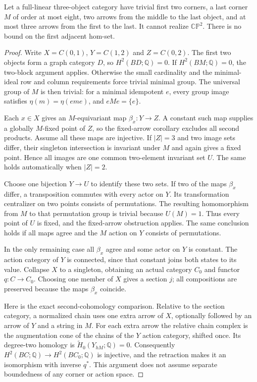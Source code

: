 \begin{proposition}
\label{CP2:A-baseline-two-small-incoming}
Let a full-linear three-object category have trivial
first two corners, a last corner $M$ of order at most
eight, two arrows from the middle to the last object,
and at most three arrows from the first to the last.
It cannot realize $\mathbb{CP}^2$.  There is no bound
on the first adjacent hom-set.
\end{proposition}
\begin{proof}
Write $X=C(0,1)$, $Y=C(1,2)$ and $Z=C(0,2)$.
The first two objects form a graph category $D$, so
$H^2(BD;\mathbb Q)=0$.  If $H^2(BM;\mathbb Q)=0$,
the two-block argument applies.  Otherwise the small
cardinality and the minimal-ideal row and column
requirements force trivial minimal group.  The
universal group of $M$ is then trivial: for a minimal
idempotent $e$, every group image satisfies
$\eta(m)=\eta(eme)$, and $eMe=\{e\}$.

Each $x\in X$ gives an $M$-equivariant map
$\beta_x:Y\to Z$.  A constant such map supplies a
globally $M$-fixed point of $Z$, so the fixed-arrow
corollary excludes all second products.  Assume all
these maps are injective.  If $|Z|=3$ and two image
sets differ, their singleton intersection is invariant
under $M$ and again gives a fixed point.  Hence all
images are one common two-element invariant set $U$.
The same holds automatically when $|Z|=2$.

Choose one bijection $Y\to U$ to identify these two
sets.  If two of the maps $\beta_x$ differ, a
transposition commutes with every actor on $Y$.
Its transformation centralizer on two points consists
of permutations.  The resulting homomorphism from
$M$ to that permutation group is trivial because
$U(M)=1$.  Thus every point of $U$ is fixed, and
the fixed-arrow obstruction applies.  The same
conclusion holds if all maps agree and the $M$ action
on $Y$ consists of permutations.

In the only remaining case all $\beta_x$ agree and
some actor on $Y$ is constant.  The action category
of $Y$ is connected, since that constant joins both
states to its value.  Collapse $X$ to a singleton,
obtaining an actual category $C_0$ and functor
$q:C\to C_0$.  Choosing one member of $X$ gives a
section $j$; all compositions are preserved because
the maps $\beta_x$ coincide.

Here is the exact second-cohomology comparison.
Relative to the section category, a normalized chain
uses one extra arrow of $X$, optionally followed by
an arrow of $Y$ and a string in $M$.  For each extra
arrow the relative chain complex is the augmentation
cone of the chains of the $Y$ action category, shifted
once.  Its degree-two homology is
$\widetilde H_0(Y_{hM};\mathbb Q)=0$.  Consequently
$H^2(BC;\mathbb Q)\to H^2(BC_0;\mathbb Q)$ is
injective, and the retraction makes it an isomorphism
with inverse $q^*$.  This argument does not assume
separate boundedness of any corner or action space.


\end{proof}
